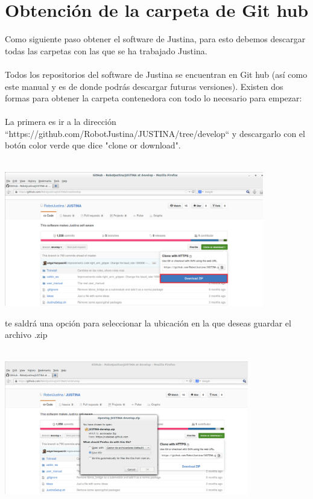 \documentclass[user_manual.tex]{subfiles}
\begin{document}
 \section{Obtención de la carpeta de Git hub}
 Como siguiente paso obtener el software de Justina, para esto debemos descargar todas las carpetas con las que se ha 
 trabajado Justina.\\
 \\
 Todos los repositorios del software de Justina se encuentran en Git hub (así como este manual y es de donde podrás descargar futuras versiones). Existen dos formas para obtener la carpeta contenedora con todo lo necesario para empezar:\\
 \\
 La primera es ir a la dirección ``https://github.com/RobotJustina/JUSTINA/tree/develop`` y descargarlo con el botón color verde
 que dice "clone or download".\\
 \\
 \begin{center}
\includegraphics[width=0.85\textwidth]{Figures/PP/pp1.png}
\end{center}
\newpage
 te saldrá una opción para seleccionar la ubicación en la que deseas guardar el archivo .zip\\
 \\
 \begin{center}
\includegraphics[width=0.8\textwidth]{Figures/PP/pp2.png}
\end{center}
\end{document}
